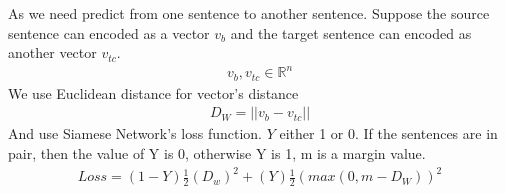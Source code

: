 \documentclass[fleqn]{MJD}
\newcommand{\0}{\emptyset}
\begin{document}
\lstset{language=Python}
\newpage
\indent As we need predict from one sentence to another sentence. Suppose the source sentence can encoded as a vector $v_{b}$ and the target sentence can encoded as another vector $v_{tc}$. \\
\begin{align}
v_{b}, v_{tc} \in \mathbb{R}^{n} \nonumber 
\end{align}
We use Euclidean distance for vector's distance \\
\begin{align}
D_{W}=||v_{b}-v_{tc}|| \nonumber
\end{align}
\indent And use Siamese Network's loss function. $Y$ either 1 or 0. If the sentences are in pair, then the value of Y is 0, otherwise Y is 1, m is a margin value. \\
\begin{align}
Loss=(1-Y)\frac{1}{2}(D_{w})^{2}+(Y)\frac{1}{2}(max(0, m-D_{W}))^{2} \nonumber
\end{align}
\end{document}
